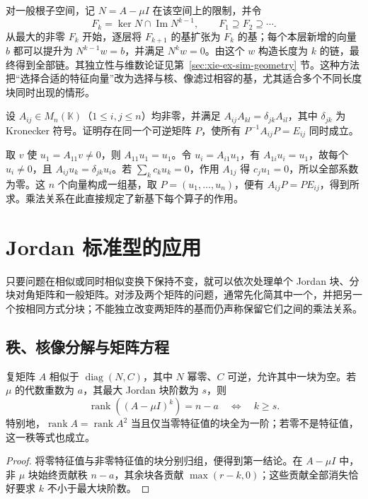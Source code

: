 对一般根子空间，记 $N=A-\mu I$ 在该空间上的限制，并令
\[
 F_k=\ker N\cap\operatorname{Im}N^{k-1},\qquad
 F_1\supseteq F_2\supseteq\cdots.
\]
从最大的非零 $F_k$ 开始，逐层将 $F_{k+1}$ 的基扩张为 $F_k$ 的基；每个本层新增的向量 $b$ 都可以提升为 $N^{k-1}w=b$，并满足 $N^kw=0$。由这个 $w$ 构造长度为 $k$ 的链，最终得到全部链。其独立性与维数论证见第~\ref{sec:xie-ex-sim-geometry} 节。这种方法把“选择合适的特征向量”改为选择与核、像滤过相容的基，尤其适合多个不同长度块同时出现的情形。

\begin{example}
设 $A_{ij}\in M_n(\mathbb K)$（$1\leq i,j\leq n$）均非零，并满足 $A_{ij}A_{kl}=\delta_{jk}A_{il}$，其中 $\delta_{jk}$ 为 Kronecker 符号。证明存在同一个可逆矩阵 $P$，使所有 $P^{-1}A_{ij}P=E_{ij}$ 同时成立。
\end{example}
\begin{solve}
取 $v$ 使 $u_1=A_{11}v\ne0$，则 $A_{11}u_1=u_1$。令 $u_i=A_{i1}u_1$，有 $A_{1i}u_i=u_1$，故每个 $u_i\ne0$，且 $A_{ij}u_k=\delta_{jk}u_i$。若 $\sum_kc_ku_k=0$，作用 $A_{1j}$ 得 $c_ju_1=0$，所以全部系数为零。这 $n$ 个向量构成一组基，取 $P=(u_1,\ldots,u_n)$，便有 $A_{ij}P=PE_{ij}$，得到所求。乘法关系在此直接规定了新基下每个算子的作用。
\end{solve}

\section{Jordan 标准型的应用}
\label{sec:xie-ex-sim-applications}

只要问题在相似或同时相似变换下保持不变，就可以依次处理单个 Jordan 块、分块对角矩阵和一般矩阵。对涉及两个矩阵的问题，通常先化简其中一个，并把另一个按相同方式分块；不能独立改变两矩阵的基而仍声称保留它们之间的乘法关系。

\subsection{秩、核像分解与矩阵方程}

\begin{proposition}
\label{prop:xie-ex-sim-fitt-zero}
复矩阵 $A$ 相似于 $\operatorname{diag}(N,C)$，其中 $N$ 幂零、$C$ 可逆，允许其中一块为空。若 $\mu$ 的代数重数为 $a$，其最大 Jordan 块阶数为 $s$，则
\[
 \operatorname{rank}((A-\mu I)^k)=n-a
 \quad\Longleftrightarrow\quad k\geq s.
\]
特别地，$\operatorname{rank}A=\operatorname{rank}A^2$ 当且仅当零特征值的块全为一阶；若零不是特征值，这一秩等式也成立。
\end{proposition}
\begin{proof}
将零特征值与非零特征值的块分别归组，便得到第一结论。在 $A-\mu I$ 中，非 $\mu$ 块始终贡献秩 $n-a$，其余块各贡献 $\max(r-k,0)$；这些贡献全部消失恰好要求 $k$ 不小于最大块阶数。
\end{proof}

